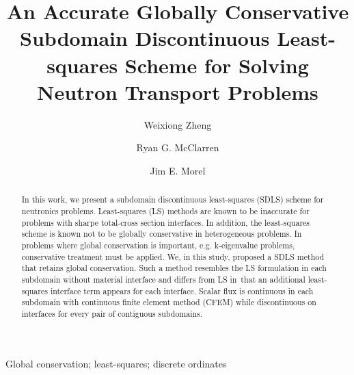 \documentclass[review]{elsarticle}
\newcommand{\TAMU}{Texas A\&M University}
\begin{document}
\begin{frontmatter}

\title{An Accurate Globally Conservative Subdomain Discontinuous Least-squares Scheme for Solving Neutron Transport Problems}%

\author[mycurrentaddress]{Weixiong Zheng}

\author[mymainaddress]{Ryan G. McClarren}

\author[mymainaddress]{Jim E. Morel}
\address[mycurrentaddress]{Nuclear Engineering, University of California,\ Berkeley,~Berkeley, CA 94709}
\address[mymainaddress]{Nuclear Engineering, \TAMU,~College Station, TX 77843-3133}

\begin{abstract}
	In this work, we present a subdomain discontinuous least-squares (SDLS) scheme for neutronics problems. {Least-squares (LS) methods are known to be inaccurate for problems with sharpe total-cross section interfaces.} In addition, the least-squares scheme is known not to be globally conservative in heterogeneous problems. In problems where global conservation is important, e.g. k-eigenvalue problems, conservative treatment must be applied. We, in this study, proposed a SDLS method that retains global conservation. Such a method resembles the LS formulation in each subdomain without material interface and differs from LS {in}\ that an additional least-squares interface term appears for each interface. Scalar flux is continuous in each subdomain with continuous finite element method (CFEM) while discontinuous on interfaces for every pair of contiguous subdomains.
\end{abstract}

\begin{keyword}
	Global conservation; least-squares; discrete ordinates
\end{keyword}

\end{frontmatter}
\end{document}
